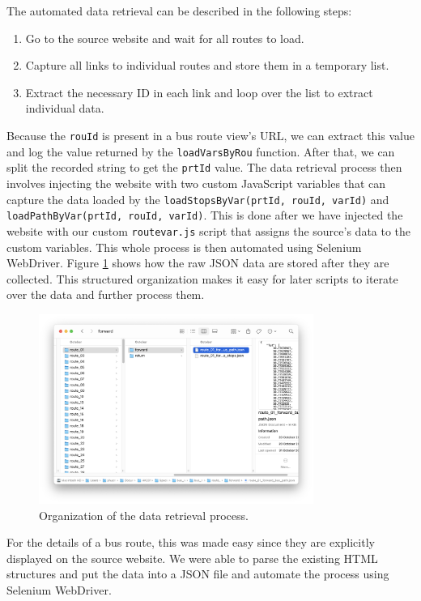 The automated data retrieval can be described in the following steps:
\begin{enumerate}
    \item Go to the source website and wait for all routes to load.
    \item Capture all links to individual routes and store them in a temporary list.
    \item Extract the necessary ID in each link and loop over the list to extract individual data.
\end{enumerate}

Because the \lstinline{rouId} is present in a bus route view's URL, we can extract this value and log the value returned by the \lstinline{loadVarsByRou} function. After that, we can split the recorded string to get the \lstinline{prtId} value. The data retrieval process then involves injecting the website with two custom JavaScript variables that can capture the data loaded by the \lstinline{loadStopsByVar(prtId, rouId, varId)} and \lstinline{loadPathByVar(prtId, rouId, varId)}. This is done after we have injected the website with our custom \lstinline{routevar.js} script that assigns the source's data to the custom variables. This whole process is then automated using Selenium WebDriver. Figure \ref{fig:data_org} shows how the raw JSON data are stored after they are collected. This structured organization makes it easy for later scripts to iterate over the data and further process them.

\begin{figure}[H]
    \centering
    \includegraphics[width=0.8\textwidth]{assets/images/Implementation/data_org.png}
    \caption{Organization of the data retrieval process.}
    \label{fig:data_org}
\end{figure}

For the details of a bus route, this was made easy since they are explicitly displayed on the source website. We were able to parse the existing HTML structures and put the data into a JSON file and automate the process using Selenium WebDriver.

